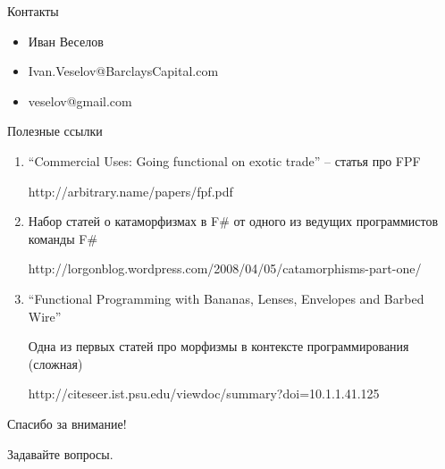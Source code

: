 \documentclass{beamer}
\begin{document}
\begin{frame}{Контакты}

\begin{itemize}
\item Иван Веселов
\item Ivan.Veselov@BarclaysCapital.com
\item veselov@gmail.com
\end{itemize}
\end{frame}\begin{frame}{Полезные ссылки}

\begin{enumerate}[1.]
\item
  ``Commercial Uses: Going functional on exotic trade'' -- статья про FPF

  http://arbitrary.name/papers/fpf.pdf
\item
  Набор статей о катаморфизмах в F\# от одного из ведущих программистов
  команды F\#

  http://lorgonblog.wordpress.com/2008/04/05/catamorphisms-part-one/
\item
  ``Functional Programming with Bananas, Lenses, Envelopes and Barbed
  Wire''

  Одна из первых статей про морфизмы в контексте программирования
  (сложная)

  http://citeseer.ist.psu.edu/viewdoc/summary?doi=10.1.1.41.125
\end{enumerate}

\end{frame}\begin{frame}{Спасибо за внимание!}
  \begin{center}
    Задавайте вопросы.
  \end{center}
\end{frame}
\end{document}
